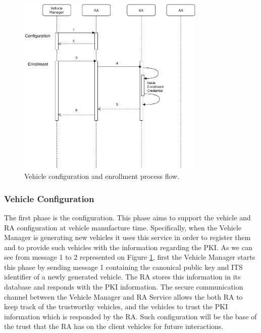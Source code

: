 \begin{figure}[t]
	\centering
	\includegraphics[width=0.8\textwidth]{Figures/protocolo_1}
	\caption{\label{fig:protocol_1}Vehicle configuration and enrollment process flow.}
\end{figure}

\subsubsection{Vehicle Configuration} \label{conf}
The first phase is the configuration. This phase aims to support the vehicle and RA configuration at vehicle manufacture time. Specifically, when the Vehicle Manager is generating new vehicles it uses this service in order to register them and to provide such vehicles with the information regarding the PKI. As we can see from message 1 to 2 represented on Figure \ref{fig:protocol_1}, first the Vehicle Manager starts this phase by sending message 1 containing the canonical public key and ITS identifier of a newly generated vehicle. The RA stores this information in its database and responds with the PKI information. The secure communication channel between the Vehicle Manager and RA Service allows the both RA to keep track of the trustworthy vehicles, and the vehicles to trust the PKI information which is responded by the RA. Such configuration will be the base of the trust that the RA has on the client vehicles for future interactions. 

